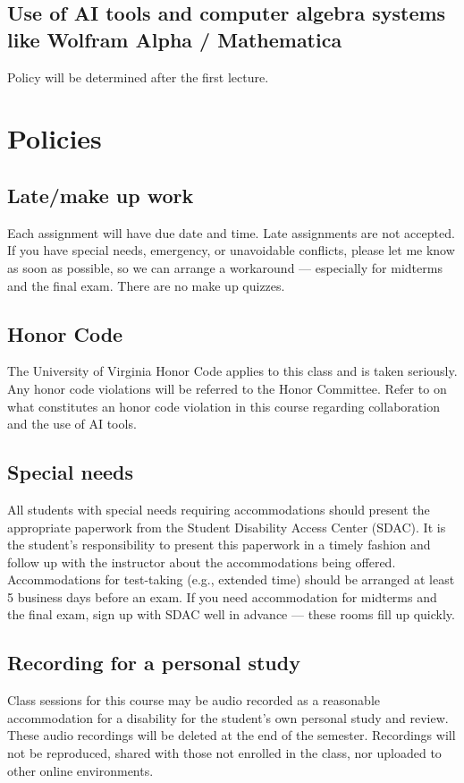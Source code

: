 \documentclass[oneside,11pt]{amsart}
\theoremstyle{definition}
\begin{document}
\subsection{Use of AI tools and computer algebra systems like Wolfram Alpha / Mathematica} 
\label{AI_tools}

Policy will be determined after the first lecture.


\section{Policies}

\subsection{Late/make up work}
Each assignment will have due date and time. Late assignments are not accepted. If you have special needs, emergency, or unavoidable conflicts, please let me know as soon as possible, so we can arrange a workaround --- especially for midterms and the final exam. There are no make up quizzes.

\subsection{Honor Code}
The University of Virginia Honor Code applies to this class and is taken seriously. Any honor code violations will be referred to the Honor Committee. Refer to  on what constitutes an honor code violation in this course regarding collaboration and the use of AI tools.

\subsection{Special needs}

All students with special needs requiring accommodations should present the appropriate paperwork from the Student Disability Access Center (SDAC). It is the student's responsibility to present this paperwork in a timely fashion and follow up with the instructor about the accommodations being offered. Accommodations for test-taking (e.g., extended time) should be arranged at least 5 business days before an exam. 
If you need accommodation for midterms and the final exam, sign up with SDAC well in advance --- these rooms fill up quickly.

\subsection{Recording for a personal study}

Class sessions for this course may be audio recorded as a
reasonable accommodation for a disability for the student’s
own personal study and review. These audio recordings will
be deleted at the end of the semester. Recordings will not
be reproduced, shared with those not enrolled in the class,
nor uploaded to other online environments.
\end{document}
